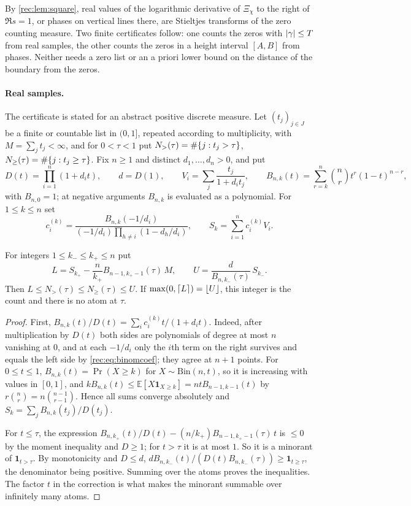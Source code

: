 By \cref{rec:lem:square}, real values of the logarithmic derivative of $\Xi_\chi$ to the right
of $\Re s=1$, or phases on vertical lines there, are Stieltjes transforms of the zero counting
measure. Two finite certificates follow: one counts the zeros with $\lvert\gamma\rvert\le T$ from real
samples, the other counts the zeros in a height interval $[A,B]$ from phases. Neither needs a
zero list or an a priori lower bound on the distance of the boundary from the zeros.

\paragraph{Real samples.}
The certificate is stated for an abstract positive discrete measure. Let $(t_j)_{j\in J}$ be a
finite or countable list in $(0,1]$, repeated according to multiplicity, with
$M=\sum_jt_j<\infty$, and for $0<\tau<1$ put $N_>(\tau)=\#\{j:t_j>\tau\}$,
$N_\ge(\tau)=\#\{j:t_j\ge\tau\}$. Fix $n\ge1$ and distinct $d_1,\dots,d_n>0$, and put
\[
 D(t)=\prod_{i=1}^n(1+d_it),\qquad d=D(1),\qquad V_i=\sum_j\frac{t_j}{1+d_it_j},\qquad
 B_{n,k}(t)=\sum_{r=k}^n\binom nrt^r(1-t)^{n-r},
\]
with $B_{n,0}=1$; at negative arguments $B_{n,k}$ is evaluated as a polynomial. For $1\le k\le n$
set
\begin{equation}\label{rec:eq:binomcoef}
 c_i^{(k)}=\frac{B_{n,k}(-1/d_i)}{(-1/d_i)\prod_{h\ne i}(1-d_h/d_i)},\qquad
 S_k=\sum_{i=1}^nc_i^{(k)}V_i .
\end{equation}

\begin{theorem}\label{rec:thm:count}
For integers $1\le k_-\le k_+\le n$ put
\[
 L=S_{k_+}-\frac n{k_+}B_{n-1,k_+-1}(\tau)\,M,\qquad U=\frac d{B_{n,k_-}(\tau)}\,S_{k_-}.
\]
Then $L\le N_>(\tau)\le N_\ge(\tau)\le U$. If $\max(0,\lceil L\rceil)=\lfloor U\rfloor$, this integer is the
count and there is no atom at $\tau$.
\end{theorem}

\begin{proof}
First, $B_{n,k}(t)/D(t)=\sum_ic_i^{(k)}t/(1+d_it)$. Indeed, after multiplication by $D(t)$ both
sides are polynomials of degree at most $n$ vanishing at $0$, and at each $-1/d_i$ only the
$i$th term on the right survives and equals the left side by \eqref{rec:eq:binomcoef}; they
agree at $n+1$ points. For $0\le t\le1$, $B_{n,k}(t)=\Pr(X\ge k)$ for $X\sim\mathrm{Bin}(n,t)$, so
it is increasing with values in $[0,1]$, and
$kB_{n,k}(t)\le\mathbb E[X\mathbf 1_{X\ge k}]=ntB_{n-1,k-1}(t)$ by $r\binom nr=n\binom{n-1}{r-1}$.
Hence all sums converge absolutely and $S_k=\sum_jB_{n,k}(t_j)/D(t_j)$.

For $t\le\tau$, the expression $B_{n,k_+}(t)/D(t)-(n/k_+)B_{n-1,k_+-1}(\tau)\,t$ is $\le0$ by the
moment inequality and $D\ge1$; for $t>\tau$ it is at most $1$. So it is a minorant of
$\mathbf 1_{t>\tau}$. By monotonicity and $D\le d$,
$dB_{n,k_-}(t)/(D(t)B_{n,k_-}(\tau))\ge\mathbf 1_{t\ge\tau}$, the denominator being positive. Summing
over the atoms proves the inequalities. The factor $t$ in the correction is what makes the
minorant summable over infinitely many atoms.
\end{proof}

